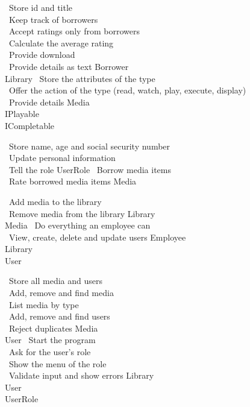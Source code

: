 \bigskip
\noindent
{}
 {\textbullet~Store id and title\\
  \textbullet~Keep track of borrowers\\
  \textbullet~Accept ratings only from borrowers\\
  \textbullet~Calculate the average rating\\
  \textbullet~Provide download\\
  \textbullet~Provide details as text}
 {Borrower\\ Library}
\hfill
{}
 {\textbullet~Store the attributes of the type\\
  \textbullet~Offer the action of the type (read, watch, play, execute, display)\\
  \textbullet~Provide details}
 {Media\\ IPlayable\\ ICompletable}
\par\medskip\noindent
{}
 {\textbullet~Store name, age and social security number\\
  \textbullet~Update personal information\\
  \textbullet~Tell the role}
 {UserRole}
\hfill
{}
 {\textbullet~Borrow media items\\
  \textbullet~Rate borrowed media items}
 {Media}
\par\medskip\noindent
{}
 {\textbullet~Add media to the library\\
  \textbullet~Remove media from the library}
 {Library\\ Media}
\hfill
{}
 {\textbullet~Do everything an employee can\\
  \textbullet~View, create, delete and update users}
 {Employee\\ Library\\ User}
\par\medskip\noindent
{}
 {\textbullet~Store all media and users\\
  \textbullet~Add, remove and find media\\
  \textbullet~List media by type\\
  \textbullet~Add, remove and find users\\
  \textbullet~Reject duplicates}
 {Media\\ User}
\hfill
{}
 {\textbullet~Start the program\\
  \textbullet~Ask for the user's role\\
  \textbullet~Show the menu of the role\\
  \textbullet~Validate input and show errors}
 {Library\\ User\\ UserRole}
\par


